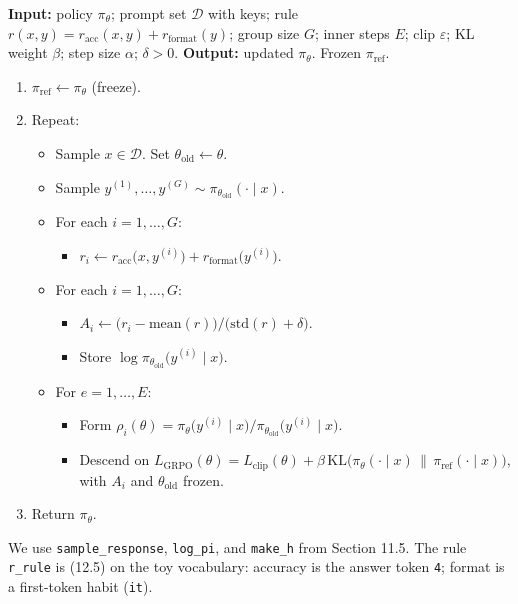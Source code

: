 \begin{implnote}
\textbf{Input:} policy $\pi_\theta$; prompt set $\mathcal{D}$ with keys; rule $r(x,y)=r_{\mathrm{acc}}(x,y)+r_{\mathrm{format}}(y)$; group size $G$; inner steps $E$; clip $\varepsilon$; KL weight $\beta$; step size $\alpha$; $\delta>0$. \textbf{Output:} updated $\pi_\theta$. Frozen $\pi_{\mathrm{ref}}$.

\begin{enumerate}
\item $\pi_{\mathrm{ref}}\leftarrow\pi_\theta$ (freeze).
\item Repeat:
\begin{itemize}
\item Sample $x\in\mathcal{D}$. Set $\theta_{\mathrm{old}}\leftarrow\theta$.
\item Sample $y^{(1)},\ldots,y^{(G)}\sim\pi_{\theta_{\mathrm{old}}}(\cdot\mid x)$.
\item For each $i=1,\ldots,G$:
\begin{itemize}
\item $r_i\leftarrow r_{\mathrm{acc}}\bigl(x,y^{(i)}\bigr)+r_{\mathrm{format}}\bigl(y^{(i)}\bigr)$.
\end{itemize}
\item For each $i=1,\ldots,G$:
\begin{itemize}
\item $A_i\leftarrow\bigl(r_i-\mathrm{mean}(r)\bigr)/\bigl(\mathrm{std}(r)+\delta\bigr)$.
\item Store $\log\pi_{\theta_{\mathrm{old}}}\bigl(y^{(i)}\mid x\bigr)$.
\end{itemize}
\item For $e=1,\ldots,E$:
\begin{itemize}
\item Form $\rho_i(\theta)=\pi_\theta\bigl(y^{(i)}\mid x\bigr)/\pi_{\theta_{\mathrm{old}}}\bigl(y^{(i)}\mid x\bigr)$.
\item Descend on $L_{\mathrm{GRPO}}(\theta)=L_{\mathrm{clip}}(\theta)+\beta\,\mathrm{KL}\bigl(\pi_\theta(\cdot\mid x)\,\|\,\pi_{\mathrm{ref}}(\cdot\mid x)\bigr)$, with $A_i$ and $\theta_{\mathrm{old}}$ frozen.
\end{itemize}
\end{itemize}
\item Return $\pi_\theta$.
\end{enumerate}

\end{implnote}

We use \texttt{sample\_response}, \texttt{log\_pi}, and \texttt{make\_h} from Section 11.5. The rule \texttt{r\_rule} is (12.5) on the toy vocabulary: accuracy is the answer token \texttt{4}; format is a first-token habit (\texttt{it}).

